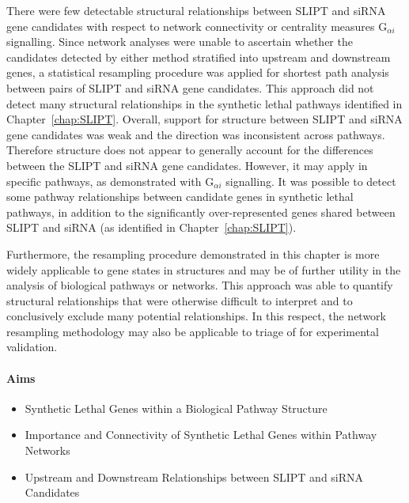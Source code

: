 There were few detectable structural relationships between \gls{SLIPT} and \gls{siRNA} gene candidates with respect to network connectivity or \gls{centrality} measures G$_{\alpha i}$ signalling. Since network analyses were unable to ascertain whether the candidates detected by either method stratified into upstream and downstream genes, %
%
a statistical resampling procedure was applied for \gls{shortest path} analysis between pairs of \gls{SLIPT} and \gls{siRNA} gene candidates. %
This approach did not detect many structural relationships in the \gls{synthetic lethal} \glspl{pathway} identified in Chapter~\ref{chap:SLIPT}. Overall, support for  structure between \gls{SLIPT} and \gls{siRNA} gene candidates was weak and the direction was inconsistent across \glspl{pathway}. Therefore  structure does not appear to generally account for the differences between the \gls{SLIPT} and \gls{siRNA} gene candidates. However, it may apply in specific \glspl{pathway}, as demonstrated with G$_{\alpha i}$ signalling. It was possible to detect some \gls{pathway} relationships between candidate genes in \gls{synthetic lethal} \glspl{pathway}, in addition to the significantly over-represented genes shared between \gls{SLIPT} and \gls{siRNA} (as identified in  Chapter~\ref{chap:SLIPT}).

Furthermore, the resampling procedure demonstrated in this chapter is more widely applicable to gene states in  structures and may be of further utility in the analysis of biological \glspl{pathway} or networks. This approach was able to quantify structural relationships that were otherwise difficult to interpret and to conclusively exclude many potential relationships. In this respect, the network resampling methodology may also be applicable to triage of  for experimental validation.

\clearpage

\iffalse
\paragraph{Aims}

  \begin{itemize}
   \item Synthetic Lethal Genes within a Biological Pathway Structure
   
   \bigskip
   
   \item Importance and Connectivity of Synthetic Lethal Genes within Pathway Networks
   
   \bigskip
   
   \item Upstream and Downstream Relationships between SLIPT and \gls{siRNA} Candidates
  \end{itemize}

